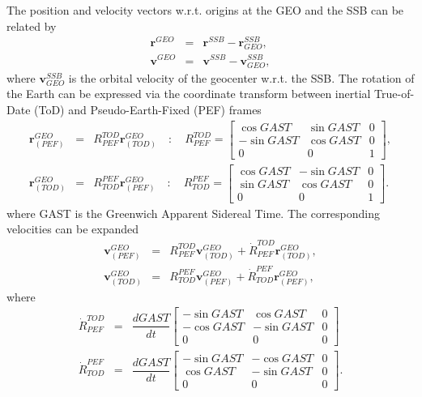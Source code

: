 \documentclass [12pt, a4paper] {article}
\newcommand{\vc}[1]
{
	\boldsymbol{#1}
}
\newcommand{\diff}[2]
{
	\dfrac{d #1}{d #2}
}
\begin{document}
The position and velocity vectors w.r.t. origins at the GEO and the SSB
can be related by
\begin {eqnarray}
    \vc r^{GEO} &=& \vc r^{SSB} - \vc r_{GEO}^{SSB}, \\
    \vc v^{GEO} &=& \vc v^{SSB} - \vc v_{GEO}^{SSB},
\end {eqnarray}
where $\vc v_{GEO}^{SSB}$ is the orbital velocity of the geocenter w.r.t. 
the SSB. The rotation of the Earth can be expressed via the coordinate 
transform between inertial True-of-Date (ToD) and Pseudo-Earth-Fixed (PEF) 
frames 
\begin {eqnarray}
    \vc r_{(PEF)}^{GEO} 
    &=&
    R_{PEF}^{TOD} \vc r_{(TOD)}^{GEO}
    \quad : \quad 
    R_{PEF}^{TOD}
    =
    \begin {bmatrix}
        \cos GAST & \sin GAST & 0 \\
        -\sin GAST & \cos GAST & 0 \\
        0 & 0 & 1
    \end {bmatrix},
    \\
    \vc r_{(TOD)}^{GEO} 
    &=&
    R_{TOD}^{PEF} \vc r_{(PEF)}^{GEO}
    \quad : \quad 
    R_{TOD}^{PEF}
    =
    \begin {bmatrix}
        \cos GAST & -\sin GAST & 0 \\
        \sin GAST & \cos GAST & 0 \\
        0 & 0 & 1
    \end {bmatrix}.
\end {eqnarray}
where GAST is the Greenwich Apparent Sidereal Time. The corresponding velocities
can be expanded 
\begin {eqnarray}
    \vc v_{(PEF)}^{GEO}
    &=&
    R_{PEF}^{TOD}\vc v_{(TOD)}^{GEO}
    +
    {{\dot R}_{PEF}^{TOD}}\vc r_{(TOD)}^{GEO},
    \\
    \vc v_{(TOD)}^{GEO}
    &=&
    R_{TOD}^{PEF}\vc v_{(PEF)}^{GEO}
    +
    {{\dot R}_{TOD}^{PEF}}\vc r_{(PEF)}^{GEO},
\end {eqnarray}
where 
\begin {eqnarray}
    {{\dot R}_{PEF}^{TOD}} 
    &=&
    \diff{GAST}{t} 
    \begin {bmatrix}
        -\sin GAST & \cos GAST & 0 \\
        -\cos GAST & -\sin GAST & 0 \\
        0 & 0 & 0
    \end {bmatrix}
    \\
    {{\dot R}_{TOD}^{PEF}} 
    &=&
    \diff{GAST}{t} 
    \begin {bmatrix}
        -\sin GAST & -\cos GAST & 0 \\
        \cos GAST & -\sin GAST & 0 \\
        0 & 0 & 0
    \end {bmatrix}.
\end {eqnarray}
\end{document}
